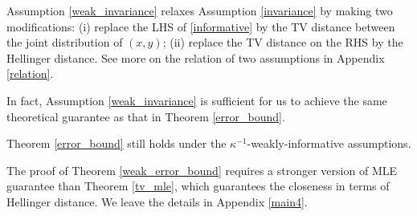 Assumption \ref{weak_invariance} relaxes Assumption \ref{invariance} by making two modifications: (i) replace the LHS of \eqref{informative} by the TV distance between the joint distribution of $(x, y)$; (ii) replace the TV distance on the RHS by the Hellinger distance. See more on the relation of two assumptions in Appendix \ref{relation}.


In fact, Assumption \ref{weak_invariance} is sufficient for us to achieve the same theoretical guarantee as that in Theorem \ref{error_bound}.

\begin{theorem}\label{weak_error_bound}
Theorem \ref{error_bound} still holds under the $\kappa^{-1}$-weakly-informative assumptions.
\end{theorem}

The proof of Theorem \ref{weak_error_bound} requires a stronger version of MLE guarantee than Theorem \ref{tv_mle}, which guarantees the closeness in terms of Hellinger distance. We leave the details in Appendix \ref{main4}.

